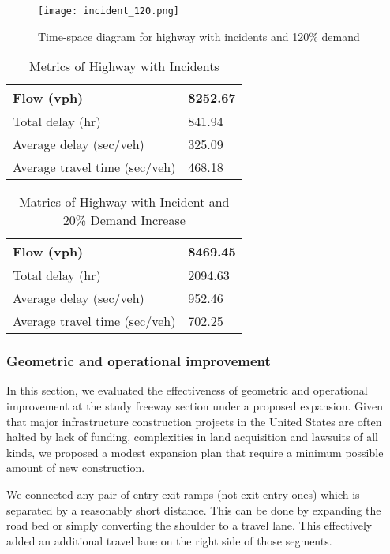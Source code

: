 \documentclass{article}
\begin{document}
\begin{figure}
    \centering
    \texttt{[image: incident\_120.png]}
    \caption{Time-space diagram for highway with incidents and 120\% demand}
    \label{fig:incident20}
\end{figure}

\begin{table}[]
\centering
\caption{Metrics of Highway with Incidents}
\begin{tabular}{|l|l|}
\hline
Flow (vph)                    & 8252.67 \\ \hline
Total delay (hr)              & 841.94  \\ \hline
Average delay (sec/veh)       & 325.09  \\ \hline
Average travel time (sec/veh) & 468.18  \\ \hline
\end{tabular}
\label{incident}
\end{table}

\begin{table}[]
\centering
\caption{Matrics of Highway with Incident and 20\% Demand Increase}
\begin{tabular}{|l|l|}
\hline
Flow (vph)                    & 8469.45 \\ \hline
Total delay (hr)              & 2094.63 \\ \hline
Average delay (sec/veh)       & 952.46  \\ \hline
Average travel time (sec/veh) & 702.25  \\ \hline
\end{tabular}
\label{incident20}
\end{table}

\subsubsection{Geometric and operational improvement}
In this section, we evaluated the effectiveness of geometric and operational improvement at the study freeway section under a proposed expansion. Given that major infrastructure construction projects in the United States are often halted by lack of funding, complexities in land acquisition and lawsuits of all kinds, we proposed a modest expansion plan that require a minimum possible amount of new construction. 

We connected any pair of entry-exit ramps (not exit-entry ones) which is separated by a reasonably short distance. This can be done by expanding the road bed or simply converting the shoulder to a travel lane. This effectively added an additional travel lane on the right side of those segments.
\end{document}
